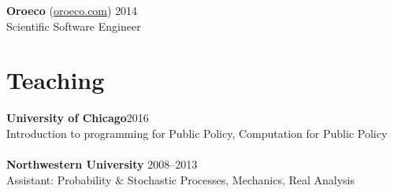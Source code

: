 \documentclass[margin,line]{resume}
\begin{document}
\begin{resume}
	{\bf Oroeco} (\href{http://www.oroeco.com}{oroeco.com}) \hfill {2014} \\
	Scientific Software Engineer %
        \section{\mysidestyle Teaching}
        {\bf University of Chicago}\hfill{2016}\\
        Introduction to programming for Public Policy, Computation for Public Policy\\\\
	{\bf Northwestern University} \hfill {2008--2013}\\
	Assistant: Probability \& Stochastic Processes, Mechanics, Real Analysis%
	





\end{resume}
\end{document}
